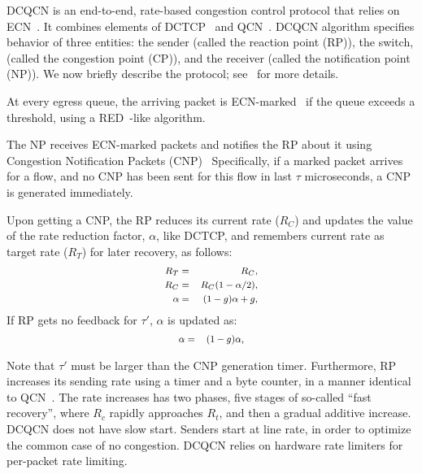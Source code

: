 DCQCN is an end-to-end, rate-based congestion control protocol that relies on
ECN~\cite{ecn}. It combines elements of DCTCP~\cite{dctcp} and QCN~\cite{qcn}.
DCQCN algorithm specifies behavior of three entities: the sender (called the
reaction point (RP)), the switch, (called the congestion point (CP)), and the
receiver (called the notification point (NP)). We now briefly describe the
protocol; see~\cite{dcqcn} for more details.

 At every egress queue, the arriving packet is
ECN-marked~\cite{ecn} if the queue exceeds a threshold, using a
RED~\cite{red}-like algorithm.

 The NP receives ECN-marked packets and notifies the RP about
it using Congestion Notification Packets (CNP)~\cite{rocev2} Specifically, if a
marked packet arrives for a flow, and no CNP has been sent for this flow in last
$\tau$ microseconds, a CNP is generated immediately.

 Upon getting a CNP, the RP reduces its current rate ($R_C$)
and updates the value of the rate reduction factor, $\alpha$, like DCTCP, and
remembers current rate as target rate ($R_T$) for later recovery, as follows:
\begin{equation} 
\small 
\begin{aligned} 
R_T &=& R_C,	\\ 
R_C &=& R_C (1 -\alpha/2),  \\ 
\alpha &=& (1-g)\alpha + g, 
\end{aligned} 
\label{eq:rp_dec}
\end{equation} 
If RP gets no feedback for $\tau'$, $\alpha$ is updated as:
\begin{equation} 
\small 
\begin{aligned} 
\alpha &=& (1-g)\alpha, 
\end{aligned}
\label{eq:rp_alpha_recover} 
\end{equation}

Note that $\tau'$ must be larger than the CNP generation timer. Furthermore, RP
increases its sending rate using a timer and a byte counter, in a manner
identical to QCN~\cite{qcn}. The rate increases has two phases, five stages of
so-called ``fast recovery'', where $R_c$ rapidly approaches $R_t$, and then a
gradual additive increase.  DCQCN does not have slow start. Senders start at
line rate, in order to optimize the common case of no congestion. DCQCN relies
on hardware rate limiters for per-packet rate limiting. 
